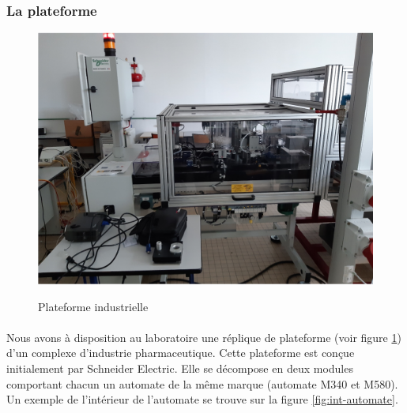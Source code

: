             \subsubsection{La plateforme}
            \label{part-automate}
                \begin{figure}[H]
                    \centering
                    \begin{frame}{\includegraphics[width=1\textwidth]{image/plateforme.jpg}}
                    \end{frame}
                    \caption{\label{fig:plateforme}Plateforme industrielle}
                \end{figure}
                
                \paragraph*{}
                Nous avons à disposition au laboratoire une réplique de plateforme (voir figure \ref{fig:plateforme}) d'un complexe d'industrie pharmaceutique. Cette plateforme est conçue initialement par Schneider Electric. Elle se décompose en deux modules comportant chacun un automate de la même marque (automate M340 et M580). Un exemple de l'intérieur de l'automate se trouve sur la figure \ref{fig:int-automate}.
                
